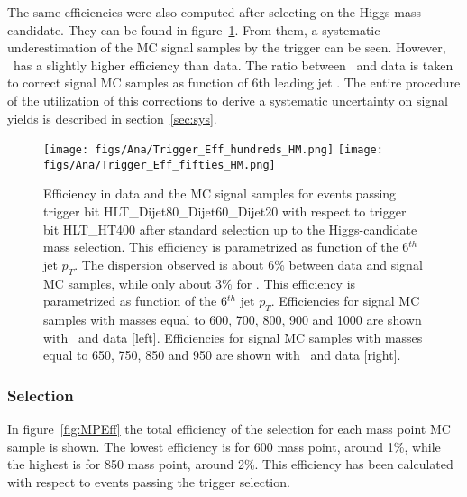 The same efficiencies were also computed after selecting on the Higgs mass candidate. They can be found in figure~\ref{fig:TrigEffPostMH}. From them, a systematic underestimation of the MC signal samples by the trigger can be seen. However, \ttbar~has a slightly higher efficiency than data. The ratio between \ttbar~and data is taken to correct signal MC samples as function of 6th leading jet \pt. The entire procedure of the utilization of this corrections to derive a systematic uncertainty on signal yields is described in section~\ref{sec:sys}. %

\begin{figure}[!Hhtbp]
  \begin{center}
    \texttt{[image: figs/Ana/Trigger\_Eff\_hundreds\_HM.png]}
    \texttt{[image: figs/Ana/Trigger\_Eff\_fifties\_HM.png]}
    \caption{Efficiency in data and the MC signal samples for events passing trigger bit HLT\_Dijet80\_Dijet60\_Dijet20 with respect to trigger bit HLT\_HT400 after standard selection up to the Higgs-candidate mass selection. This efficiency is parametrized as function of the 6$^{th}$ jet $p_{T}$. The dispersion observed is about 6\% between data and signal MC samples, while only about 3\%  for \ttbar. This efficiency is parametrized as function of the 6$^{th}$ jet $p_{T}$. Efficiencies for signal MC samples with \Tp masses equal to 600, 700, 800, 900 and 1000 \GeVcc are shown with \ttbar~and data [left]. Efficiencies for signal MC samples with \Tp masses equal to 650, 750, 850 and 950 \GeVcc are shown with \ttbar~and data [right].}
    \label{fig:TrigEffPostMH}
  \end{center}
\end{figure}

\subsubsection{Selection}
\label{sec:seleff}

In figure~\ref{fig:MPEff} the total efficiency of the selection for each mass point MC sample is shown. The lowest efficiency is for 600 \GeVcc mass point, around 1\%, while the highest is for 850 \GeVcc mass point, around 2\%. This efficiency has been calculated with respect to events passing the trigger selection.  

